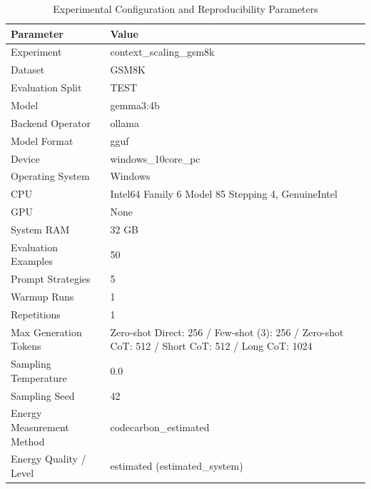 \begin{table}
\caption{Experimental Configuration and Reproducibility Parameters}
\label{tab:experimental_configuration}
\begin{tabular}{ll}
\toprule
Parameter & Value \\
\midrule
Experiment & context\_scaling\_gsm8k \\
Dataset & GSM8K \\
Evaluation Split & TEST \\
Model & gemma3:4b \\
Backend Operator & ollama \\
Model Format & gguf \\
Device & windows\_10core\_pc \\
Operating System & Windows \\
CPU & Intel64 Family 6 Model 85 Stepping 4, GenuineIntel \\
GPU & None \\
System RAM & 32 GB \\
Evaluation Examples & 50 \\
Prompt Strategies & 5 \\
Warmup Runs & 1 \\
Repetitions & 1 \\
Max Generation Tokens & Zero-shot Direct: 256 / Few-shot (3): 256 / Zero-shot CoT: 512 / Short CoT: 512 / Long CoT: 1024 \\
Sampling Temperature & 0.0 \\
Sampling Seed & 42 \\
Energy Measurement Method & codecarbon\_estimated \\
Energy Quality / Level & estimated (estimated\_system) \\
\bottomrule
\end{tabular}
\end{table}
